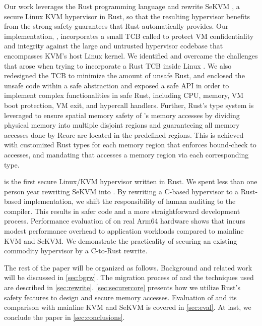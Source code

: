 Our work leverages the Rust programming language and rewrite SeKVM \cite{sekvm},
a secure Linux KVM hypervisor in Rust, so that the resulting hypervisor
benefits from the strong safety guarantees that Rust automatically provides.
Our implementation, \rustsec{}, incorporates a small TCB called \rustcore{} to
protect VM confidentiality and integrity against the large and untrusted
hypervisor codebase that encompasses KVM’s host Linux kernel.
We identified and overcame the challenges that arose when trying to
incorporate a Rust TCB inside Linux .
We also redesigned the \rustcore{} TCB to minimize the amount of unsafe Rust,
and enclosed the unsafe code within a safe abstraction and exposed a safe API
in order to implement complex functionalities in safe Rust, including CPU,
memory, VM boot protection, VM exit, and hypercall handlers.
Further, Rust’s type system is leveraged to ensure spatial memory safety of
\rustcore{}’s memory accesses by dividing physical memory into multiple
disjoint regions and guaranteeing all memory accesses done by Rcore are located
in the predefined regions.
This is achieved with customized Rust types for each memory region that
enforces bound-check to accesses, and mandating that \rustcore{} accesses a
memory region via each corresponding type.

\rustsec{} is the first secure Linux/KVM hypervisor written in Rust.
We spent less than one person year rewriting SeKVM into \rustsec{}.
By rewriting a C-based hypervisor to a Rust-based implementation,
we shift the responsibility of human auditing to the compiler.
This results in safer code and a more straightforward development process.
Performance evaluation of \rustsec{} on real Arm64 hardware shows that
\rustsec{} incurs modest performance overhead to application workloads
compared to mainline KVM and SeKVM. We demonstrate the practicality of
securing an existing commodity hypervisor by a C-to-Rust rewrite.

The rest of the paper will be organized as follows. Background and related work
will be discussed in \autoref{sec:bgrw}. The migration process of \rustsec{}
and the techniques used are described in \autoref{sec:rewrite}.
\autoref{sec:securercore} presents how we utilize Rust's safety features to
design and secure \rustcore{} memory accesses.
Evaluation of \rustsec{} and its comparison with mainline KVM and SeKVM is
covered in \autoref{sec:eval}. At last, we conclude the paper in
\autoref{sec:conclusions}.

